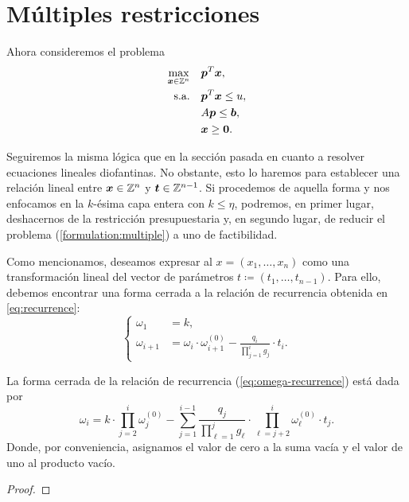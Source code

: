 \section{Múltiples restricciones}
\noindent
Ahora consideremos el problema
\begin{subequations}
	\label{formulation:multiple}
	\begin{align}
		\max_{\boldsymbol{x} \in \mathbb{Z}^n} \quad
			& \boldsymbol{p}^T\boldsymbol{x}, \label{formulation:multiple:objective} \\
		\text{s.a.} \quad
			& \boldsymbol{p}^T\boldsymbol{x} \leq u, \label{formulation:multiple:constraint:budget} \\
			& A\boldsymbol{p} \leq \boldsymbol{b}, \label{formulation:multiple:constraints} \\
			& \boldsymbol{x} \geq \boldsymbol{0}. \nonumber
	\end{align}
\end{subequations}

Seguiremos la misma lógica que en la sección pasada en cuanto a resolver ecuaciones lineales
diofantinas. No obstante, esto lo haremos para establecer una relación lineal entre $\boldsymbol{x} \in
\mathbb{Z}^n$ y $\boldsymbol{t} \in \mathbb{Z}^{n-1}$. Si procedemos de aquella forma y nos enfocamos en la $k$-ésima capa
entera con $k \leq \eta$, podremos, en primer lugar, deshacernos de la restricción presupuestaria y,
en segundo lugar, de reducir el problema (\ref{formulation:multiple}) a uno de factibilidad.

Como mencionamos, deseamos expresar al $x = (x_1, \ldots, x_n)$ como una transformación lineal del
vector de parámetros $t \coloneq (t_1, \ldots, t_{n-1})$. Para ello, debemos encontrar una forma
cerrada a la relación de recurrencia obtenida en \ref{eq:recurrence}:
\begin{equation}
	\label{eq:omega-recurrence}
	\begin{cases}
		\omega_1 &= k, \\
		\omega_{i + 1} &= \omega_i \cdot \omega_{i + 1}^{(0)} - \frac{q_i}{\prod_{j=1}^{i}g_j} \cdot t_i.
	\end{cases}
\end{equation}

\begin{lemma}
	La forma cerrada de la relación de recurrencia (\ref{eq:omega-recurrence}) está dada por
	\begin{equation}
		\label{eq:omega-formula}
		\omega_i = k \cdot \prod_{j=2}^{i} \omega_j^{(0)} -
				 \sum_{j=1}^{i - 1}\frac{q_j}{\prod_{\ell=1}^{j}g_\ell} \cdot
				 \prod_{\ell=j+2}^{i}\omega_\ell^{(0)} \cdot t_j.
	\end{equation}
	Donde, por conveniencia, asignamos el valor de cero a la suma vacía y el valor de uno al
	producto vacío.
\end{lemma}
\begin{proof}
\end{proof}

